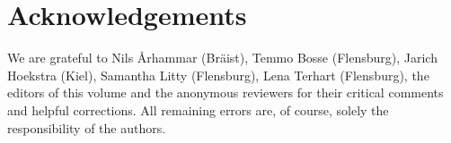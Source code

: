 \documentclass[output=paper]{langsci/langscibook}
\begin{document}
\section*{Acknowledgements}

We are grateful to Nils Århammar (Bräist), Temmo Bosse (Flensburg), Jarich Hoekstra (Kiel), Samantha Litty (Flensburg), Lena Terhart (Flensburg), the editors of this volume and the anonymous reviewers for their critical comments and helpful corrections. All remaining errors are, of course, solely the responsibility of the authors.


{\sloppy\printbibliography[heading=subbibliography,notkeyword=this]}
\end{document}
